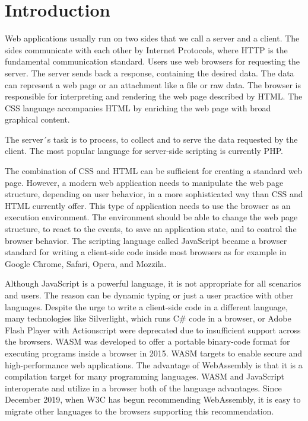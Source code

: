 \chapter{Introduction}

Web applications usually run on two sides that we call a server and a client.
The sides communicate with each other by Internet Protocols, where
\ac{HTTP} is the fundamental communication standard.
Users use web browsers for requesting the server. The server sends back a response, containing the desired data.
The data can represent a web page or an attachment like a file or raw data.
The browser is responsible for interpreting and rendering the web page described by \ac{HTML}.
The \ac{CSS} language accompanies HTML by enriching the web page with broad graphical content. 
\par
The server´s task is to process, to collect and to serve the data requested by the client.
The most popular language for server-side scripting is currently PHP. 
\par
The combination of CSS and HTML can be sufficient for creating a standard web page.
However, a modern web application needs to manipulate the web page structure, depending on user behavior, in a more sophisticated way than CSS and HTML currently offer.
This type of application needs to use the browser as an execution environment. The environment should be able to change the web page structure, to react to the events, to save an application state, and to control the browser behavior. 
The scripting language called JavaScript became a browser standard for writing a client-side code inside most browsers as for example in Google Chrome, Safari, Opera, and Mozzila.
\par
Although JavaScript is a powerful language, it is not appropriate for all scenarios and users.
The reason can be dynamic typing or just a user practice with other languages.
Despite the urge to write a client-side code in a different language, many technologies like Silverlight, which runs C\# code in a browser, or Adobe Flash Player with Actionscript were deprecated due to insufficient support across the browsers.
\ac{WASM} \cite{online:wasmWiki} was developed to offer a portable binary-code format for executing programs inside a browser in 2015.
WASM targets to enable secure and high-performance web applications.
The advantage of WebAssembly is that it is a compilation target for many programming languages.
WASM and JavaScript interoperate and utilize in a browser both of the language advantages.
Since December 2019, when \ac{W3C} has begun recommending WebAssembly, it is easy to migrate other languages to the browsers supporting this recommendation.
